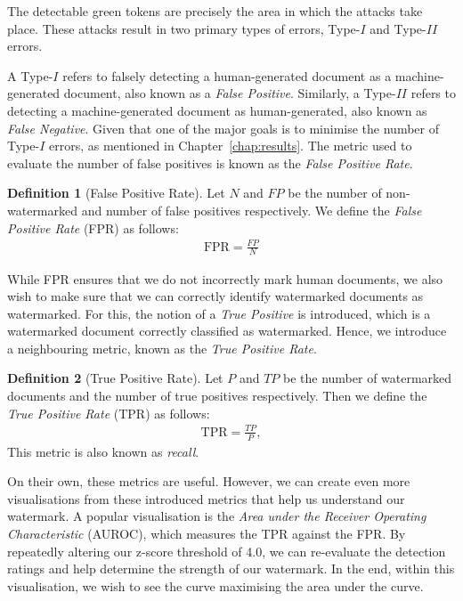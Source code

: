 \documentclass{l4proj}
\theoremstyle{definition}
\newtheorem{definition}{Definition}[section]
\begin{document}
        The detectable green tokens are precisely the area in which the attacks take place. These attacks result in two primary types of errors, Type-$I$ and Type-$II$ errors. 
        
        A Type-$I$ refers to falsely detecting a human-generated document as a machine-generated document, also known as a \emph{False Positive}. Similarly, a Type-$II$ refers to detecting a machine-generated document as human-generated, also known as \emph{False Negative}. Given that one of the major goals is to minimise the number of Type-$I$ errors, as mentioned in Chapter~\ref{chap:results}. The metric used to evaluate the number of false positives is known as the \emph{False Positive Rate}.

        \begin{definition}[False Positive Rate]
            Let $N$ and $FP$ be the number of non-watermarked and number of false positives respectively. We define the \emph{False Positive Rate} (FPR) as follows:
            \begin{align*}
                \text{FPR} = \frac{FP}{N}
            \end{align*}
        \end{definition}

        While FPR ensures that we do not incorrectly mark human documents, we also wish to make sure that we can correctly identify watermarked documents as watermarked. For this, the notion of a \emph{True Positive} is introduced, which is a watermarked document correctly classified as watermarked. Hence, we introduce a neighbouring metric, known as the \emph{True Positive Rate}. 

        \begin{definition}[True Positive Rate]
            Let $P$ and $TP$ be the number of watermarked documents and the number of true positives respectively. Then we define the \emph{True Positive Rate} (TPR) as follows:
            \begin{align*}
                \text{TPR} = \frac{TP}{P},
            \end{align*}
            This metric is also known as \emph{recall}.
        \end{definition}

        On their own, these metrics are useful. However, we can create even more visualisations from these introduced metrics that help us understand our watermark. A popular visualisation is the \emph{Area under the Receiver Operating Characteristic} (AUROC), which measures the TPR against the FPR. By repeatedly altering our z-score threshold of 4.0, we can re-evaluate the detection ratings and help determine the strength of our watermark. In the end, within this visualisation, we wish to see the curve maximising the area under the curve.
        
\end{document}
